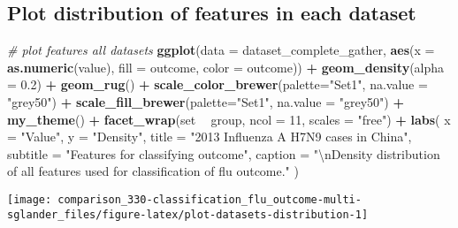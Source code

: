 \documentclass[]{book}
\newenvironment{Shaded}{\begin{snugshade}}{\end{snugshade}}
\newcommand{\CharTok}[1]{\textcolor[rgb]{0.31,0.60,0.02}{#1}}
\newcommand{\CommentTok}[1]{\textcolor[rgb]{0.56,0.35,0.01}{\textit{#1}}}
\newcommand{\DataTypeTok}[1]{\textcolor[rgb]{0.13,0.29,0.53}{#1}}
\newcommand{\DecValTok}[1]{\textcolor[rgb]{0.00,0.00,0.81}{#1}}
\newcommand{\FloatTok}[1]{\textcolor[rgb]{0.00,0.00,0.81}{#1}}
\newcommand{\KeywordTok}[1]{\textcolor[rgb]{0.13,0.29,0.53}{\textbf{#1}}}
\newcommand{\NormalTok}[1]{#1}
\newcommand{\OperatorTok}[1]{\textcolor[rgb]{0.81,0.36,0.00}{\textbf{#1}}}
\newcommand{\StringTok}[1]{\textcolor[rgb]{0.31,0.60,0.02}{#1}}
\begin{document}
\hypertarget{plot-distribution-of-features-in-each-dataset}{%
\subsection{Plot distribution of features in each dataset}\label{plot-distribution-of-features-in-each-dataset}}

\begin{Shaded}
\begin{Highlighting}[]
\CommentTok{# plot features all datasets}
\KeywordTok{ggplot}\NormalTok{(}\DataTypeTok{data =}\NormalTok{ dataset_complete_gather, }
       \KeywordTok{aes}\NormalTok{(}\DataTypeTok{x =} \KeywordTok{as.numeric}\NormalTok{(value), }\DataTypeTok{fill =}\NormalTok{ outcome, }\DataTypeTok{color =}\NormalTok{ outcome)) }\OperatorTok{+}
\StringTok{  }\KeywordTok{geom_density}\NormalTok{(}\DataTypeTok{alpha =} \FloatTok{0.2}\NormalTok{) }\OperatorTok{+}
\StringTok{  }\KeywordTok{geom_rug}\NormalTok{() }\OperatorTok{+}
\StringTok{  }\KeywordTok{scale_color_brewer}\NormalTok{(}\DataTypeTok{palette=}\StringTok{"Set1"}\NormalTok{, }\DataTypeTok{na.value =} \StringTok{"grey50"}\NormalTok{) }\OperatorTok{+}
\StringTok{  }\KeywordTok{scale_fill_brewer}\NormalTok{(}\DataTypeTok{palette=}\StringTok{"Set1"}\NormalTok{, }\DataTypeTok{na.value =} \StringTok{"grey50"}\NormalTok{) }\OperatorTok{+}
\StringTok{  }\KeywordTok{my_theme}\NormalTok{() }\OperatorTok{+}
\StringTok{  }\KeywordTok{facet_wrap}\NormalTok{(set }\OperatorTok{~}\StringTok{ }\NormalTok{group, }\DataTypeTok{ncol =} \DecValTok{11}\NormalTok{, }\DataTypeTok{scales =} \StringTok{"free"}\NormalTok{) }\OperatorTok{+}
\StringTok{  }\KeywordTok{labs}\NormalTok{(}
    \DataTypeTok{x =} \StringTok{"Value"}\NormalTok{,}
    \DataTypeTok{y =} \StringTok{"Density"}\NormalTok{,}
    \DataTypeTok{title =} \StringTok{"2013 Influenza A H7N9 cases in China"}\NormalTok{,}
    \DataTypeTok{subtitle =} \StringTok{"Features for classifying outcome"}\NormalTok{,}
    \DataTypeTok{caption =} \StringTok{"}\CharTok{\textbackslash{}n}\StringTok{Density distribution of all features used for }
\StringTok{    classification of flu outcome."}
\NormalTok{  )}
\end{Highlighting}
\end{Shaded}

\begin{center}\texttt{[image: comparison\_330-classification\_flu\_outcome-multi-sglander\_files/figure-latex/plot-datasets-distribution-1]} \end{center}
\end{document}
